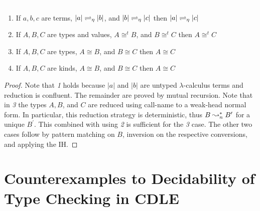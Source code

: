 \begin{lemma}
    \label{lem:4:c1_trans}
    \textcolor{white}{\_}
    \begin{enumerate}
        \item If $a, b, c$ are terms, $|a| \rightleftharpoons_\eta |b|$, and $|b| \rightleftharpoons_\eta |c|$ then $|a| \rightleftharpoons_\eta |c|$
        \item If $A, B, C$ are types and values, $A \cong^t B$, and $B \cong^t C$ then $A \cong^t C$
        \item If $A, B, C$ are types, $A \cong B$, and $B \cong C$ then $A \cong C$
        \item If $A, B, C$ are kinds, $A \cong B$, and $B \cong C$ then $A \cong C$
    \end{enumerate}
\end{lemma}
\begin{proof}
    Note that \textit{1} holds because $|a|$ and $|b|$ are untyped $\lambda$-calculus terms and reduction is confluent.
    The remainder are proved by mutual recursion.
    Note that in \textit{3} the types $A, B$, and $C$ are reduced using call-name to a weak-head normal form.
    In particular, this reduction strategy is deterministic, thus $B \leadsto^*_n B^\prime$ for a unique $B^\prime$.
    This combined with using \textit{2} is sufficient for the \textit{3} case.
    The other two cases follow by pattern matching on $B$, inversion on the respective conversions, and applying the IH.
\end{proof}

\section{Counterexamples to Decidability of Type Checking in CDLE}

